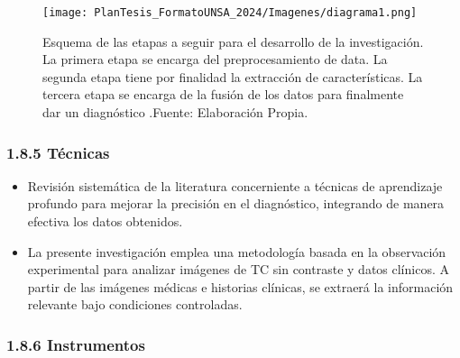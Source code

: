 \begin{figure}[!h]
	\centering
	\texttt{[image: PlanTesis\_FormatoUNSA\_2024/Imagenes/diagrama1.png]}
	\caption{Esquema de las etapas a seguir para el desarrollo de la investigación. La primera etapa se encarga del preprocesamiento de data. La segunda etapa tiene por finalidad la extracción de características. La tercera etapa se encarga de la fusión de los datos para finalmente dar un diagnóstico .Fuente: Elaboración Propia.}
	\label{Figure:figure3}
\end{figure}


\subsubsection{1.8.5 Técnicas}
\begin{itemize}

\item Revisión sistemática de la literatura concerniente a técnicas de aprendizaje profundo para mejorar la precisión en el diagnóstico, integrando de manera efectiva los datos obtenidos.
\item La presente investigación emplea una metodología basada en la observación experimental para analizar imágenes de TC sin contraste y datos clínicos. A partir de las imágenes médicas e historias clínicas, se extraerá la información relevante bajo condiciones controladas. 


\end{itemize}
\subsubsection{1.8.6 Instrumentos}


